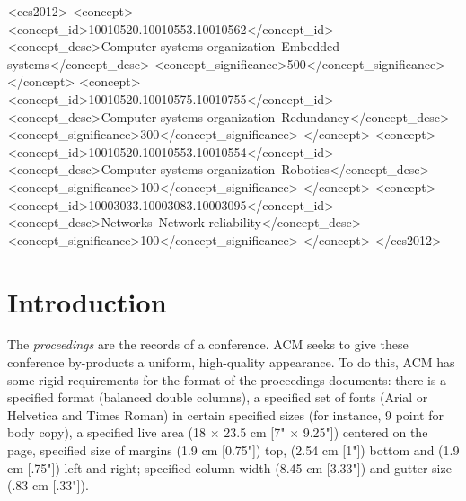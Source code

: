 \documentclass{sig-alternate-05-2015}
\begin{document}
%
%
\begin{CCSXML}
<ccs2012>
 <concept>
  <concept_id>10010520.10010553.10010562</concept_id>
  <concept_desc>Computer systems organization~Embedded systems</concept_desc>
  <concept_significance>500</concept_significance>
 </concept>
 <concept>
  <concept_id>10010520.10010575.10010755</concept_id>
  <concept_desc>Computer systems organization~Redundancy</concept_desc>
  <concept_significance>300</concept_significance>
 </concept>
 <concept>
  <concept_id>10010520.10010553.10010554</concept_id>
  <concept_desc>Computer systems organization~Robotics</concept_desc>
  <concept_significance>100</concept_significance>
 </concept>
 <concept>
  <concept_id>10003033.10003083.10003095</concept_id>
  <concept_desc>Networks~Network reliability</concept_desc>
  <concept_significance>100</concept_significance>
 </concept>
</ccs2012>  
\end{CCSXML}



%
%

%
%
\printccsdesc



\section{Introduction}
The \textit{proceedings} are the records of a conference.
ACM seeks to give these conference by-products a uniform,
high-quality appearance.  To do this, ACM has some rigid
requirements for the format of the proceedings documents: there
is a specified format (balanced  double columns), a specified
set of fonts (Arial or Helvetica and Times Roman) in
certain specified sizes (for instance, 9 point for body copy),
a specified live area (18 $\times$ 23.5 cm [7" $\times$ 9.25"]) centered on
the page, specified size of margins (1.9 cm [0.75"]) top, (2.54 cm [1"]) bottom
and (1.9 cm [.75"]) left and right; specified column width
(8.45 cm [3.33"]) and gutter size (.83 cm [.33"]).
\end{document}
